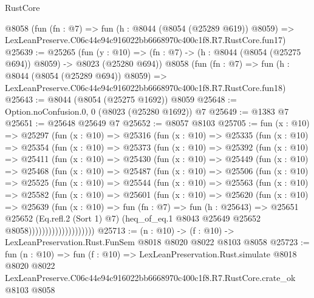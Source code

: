 \begin{lexlean}{RustCore}
\begin{coremodule}
    @8058
    (fun (fn : @7) =>
    fun (h : @8044 (@8054 (@25289 @619)) @8059) =>
    LexLeanPreserve.C06c44e94c916022bb6668970c400c1f8.R7.RustCore.fun17)
@25639 := @25265
    (fun (y : @10) => (fn : @7) -> (h : @8044 (@8054 (@25275 @694)) @8059) -> @8023 (@25280 @694))
    @8058
    (fun (fn : @7) =>
    fun (h : @8044 (@8054 (@25289 @694)) @8059) =>
    LexLeanPreserve.C06c44e94c916022bb6668970c400c1f8.R7.RustCore.fun18)
@25643 := @8044 (@8054 (@25275 @1692)) @8059
@25648 := Option.noConfusion.{0, 0} (@8023 (@25280 @1692)) @7
@25649 := @1383 @7
@25651 := @25648 @25649 @7
@25652 := @8057 @8103
@25705 := fun (x : @10) =>
  @25297
    (fun (x : @10) =>
    @25316
      (fun (x : @10) =>
      @25335
        (fun (x : @10) =>
        @25354
          (fun (x : @10) =>
          @25373
            (fun (x : @10) =>
            @25392
              (fun (x : @10) =>
              @25411
                (fun (x : @10) =>
                @25430
                  (fun (x : @10) =>
                  @25449
                    (fun (x : @10) =>
                    @25468
                      (fun (x : @10) =>
                      @25487
                        (fun (x : @10) =>
                        @25506
                          (fun (x : @10) =>
                          @25525
                            (fun (x : @10) =>
                            @25544
                              (fun (x : @10) =>
                              @25563
                                (fun (x : @10) =>
                                @25582
                                  (fun (x : @10) =>
                                  @25601
                                    (fun (x : @10) =>
                                    @25620
                                      (fun (x : @10) =>
                                      @25639
                                        (fun (x : @10) =>
                                        fun (fn : @7) =>
                                        fun (h : @25643) =>
                                        @25651
                                          @25652
                                          (Eq.refl.{2} (Sort 1) @7)
                                          (heq_of_eq.{1}
                                            @8043
                                            @25649
                                            @25652
                                            @8058))))))))))))))))))))
@25713 := (n : @10) -> (f : @10) -> LexLeanPreservation.Rust.FunSem @8018 @8020 @8022 @8103 @8058
@25723 := fun (n : @10) =>
  fun (f : @10) =>
  LexLeanPreservation.Rust.simulate
    @8018
    @8020
    @8022
    LexLeanPreserve.C06c44e94c916022bb6668970c400c1f8.R7.RustCore.crate_ok
    @8103
    @8058
\end{coremodule}
\end{lexlean}
